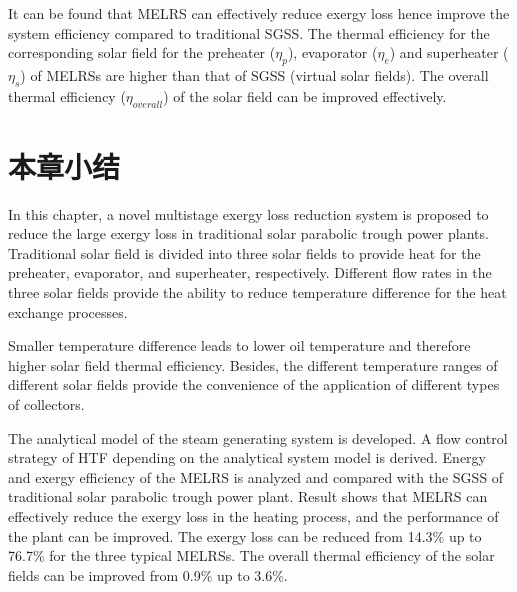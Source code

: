 It can be found that MELRS can effectively reduce exergy loss hence improve the system efficiency compared to traditional SGSS. The thermal efficiency for the corresponding solar field for the preheater ($\eta_p$), evaporator ($\eta_e$) and superheater ($\eta_s$) of MELRSs are higher than that of SGSS (virtual solar fields).
The overall thermal efficiency ($\eta_{overall}$) of the solar field can be improved effectively.

\section{本章小结}

In this chapter, a novel multistage exergy loss reduction system is proposed to reduce the large exergy loss in traditional solar parabolic trough power plants.
Traditional solar field is divided into three solar fields to provide heat for the preheater, evaporator, and superheater, respectively. Different flow rates in the three solar fields provide the ability to reduce temperature difference for the heat exchange processes.

Smaller temperature difference leads to lower oil temperature and therefore higher solar field thermal efficiency. Besides, the different temperature ranges of different solar fields provide the convenience of the application of different types of collectors.

The analytical model of the steam generating system is developed. A flow control strategy of HTF depending on the analytical system model is derived. Energy and exergy efficiency of the MELRS is analyzed and compared with the SGSS of traditional solar parabolic trough power plant. Result shows that MELRS can effectively reduce the exergy loss in the heating process, and the performance of the plant can be improved. The exergy loss can be reduced from 14.3\% up to 76.7\% for the three typical MELRSs. The overall thermal efficiency of the solar fields can be improved from 0.9\% up to 3.6\%.